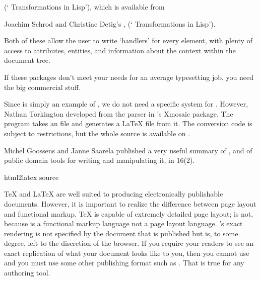 \begin{enumerate}
\begin{itemize}
\begin{narrowversion}
      (` Transformations in Lisp'), which is available from
\end{narrowversion}
\begin{wideversion}
      Joachim Schrod and Christine Detig's
      \href{ftp://ftp.tu-darmstadt.de/pub/text/sgml/stil}{},
       (` Transformations in Lisp').
\end{wideversion}
  \end{itemize}
  Both of these allow the user to write `handlers' for every 
  element, with plenty of access to attributes, entities, and
  information about the context within the document tree.

  If these packages don't meet your needs for an average 
  typesetting job, you need the big commercial stuff.
\end{enumerate}

Since  is simply an example of , we do not need a specific
system for .  However, Nathan Torkington developed
 from the  parser in 's
Xmosaic package.
The program takes an  file and generates a \LaTeX{} file from it.
The conversion code is subject to  restrictions, but the whole
source is available on .

Michel Goossens and Janne Saarela published a very useful summary of
, and of public domain tools for writing and manipulating it, in
\TUGboat{} 16(2).
\begin{ctanrefs}
\item[html2latex \nothtml{\rmfamily}source]
\end{ctanrefs}


\TeX{} and \LaTeX{} are well suited to producing electronically publishable
documents. However, it is important to realize the difference
between page layout and functional markup. \TeX{} is capable of
extremely detailed page layout;  is not, because  is a
functional markup language not a page layout language. 's exact
rendering is not specified by the document that is published but is, to
some degree, left to the discretion of the browser. If you require your
readers to see an exact replication of what your document looks like
to you, then you cannot use  and you must use some other
publishing format such as . That is true for any 
authoring tool.


